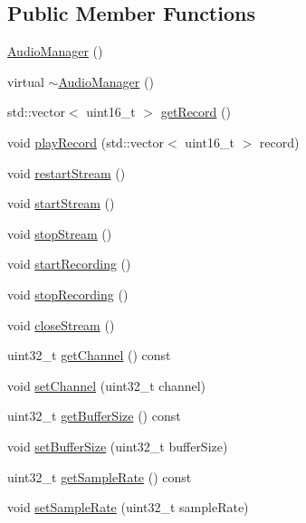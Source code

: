 \subsection*{Public Member Functions}
\begin{DoxyCompactItemize}
\item 
\mbox{\hyperlink{classbabel_1_1client_1_1_audio_manager_ab338da54012bc8407b9387023255f2d4}{Audio\+Manager}} ()
\item 
virtual \mbox{\hyperlink{classbabel_1_1client_1_1_audio_manager_a18b4dafd063c51b6d12affe991c17e75}{$\sim$\+Audio\+Manager}} ()
\item 
std\+::vector$<$ uint16\+\_\+t $>$ \mbox{\hyperlink{classbabel_1_1client_1_1_audio_manager_abe6f93340f16c366d6e2a447f8f32965}{get\+Record}} ()
\item 
void \mbox{\hyperlink{classbabel_1_1client_1_1_audio_manager_a5c3a8d97a0330be03407f8c45b7f875e}{play\+Record}} (std\+::vector$<$ uint16\+\_\+t $>$ record)
\item 
void \mbox{\hyperlink{classbabel_1_1client_1_1_audio_manager_a478deea7a48b2d3a51feb5ef01e005d6}{restart\+Stream}} ()
\item 
void \mbox{\hyperlink{classbabel_1_1client_1_1_audio_manager_a2cea1058232cdce07789770bd1e4b268}{start\+Stream}} ()
\item 
void \mbox{\hyperlink{classbabel_1_1client_1_1_audio_manager_abb1982693e6352b113cb42528f48ecf1}{stop\+Stream}} ()
\item 
void \mbox{\hyperlink{classbabel_1_1client_1_1_audio_manager_a71802aa6bb9e397add7f3d7112d35d98}{start\+Recording}} ()
\item 
void \mbox{\hyperlink{classbabel_1_1client_1_1_audio_manager_a8277b13d3973b567b9b052b6cb5c5235}{stop\+Recording}} ()
\item 
void \mbox{\hyperlink{classbabel_1_1client_1_1_audio_manager_abcdde1ea76bf4fd5c8510ade53c0da9d}{close\+Stream}} ()
\item 
uint32\+\_\+t \mbox{\hyperlink{classbabel_1_1client_1_1_audio_manager_a9d53c9ba60013ae16beee6e33147de81}{get\+Channel}} () const
\item 
void \mbox{\hyperlink{classbabel_1_1client_1_1_audio_manager_a819146d89b11a5e1f1e9c9c26c545af8}{set\+Channel}} (uint32\+\_\+t channel)
\item 
uint32\+\_\+t \mbox{\hyperlink{classbabel_1_1client_1_1_audio_manager_aca831aa108df3451f514f112c3e62e8a}{get\+Buffer\+Size}} () const
\item 
void \mbox{\hyperlink{classbabel_1_1client_1_1_audio_manager_af04bbbdc6fe71b81ae32fa3f133a1639}{set\+Buffer\+Size}} (uint32\+\_\+t buffer\+Size)
\item 
uint32\+\_\+t \mbox{\hyperlink{classbabel_1_1client_1_1_audio_manager_a6e370c5b51c74ee31a81cc7ec1cdadb2}{get\+Sample\+Rate}} () const
\item 
void \mbox{\hyperlink{classbabel_1_1client_1_1_audio_manager_a7fc93545ec57e861fff8b2ecce7e0937}{set\+Sample\+Rate}} (uint32\+\_\+t sample\+Rate)
\end{DoxyCompactItemize}



